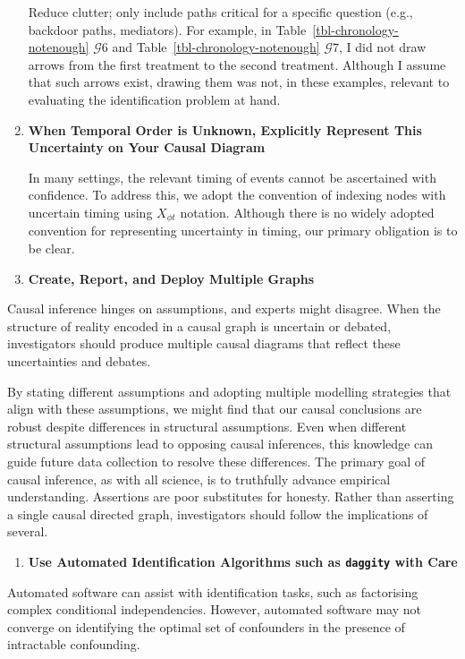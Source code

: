 \documentclass[
  single column]{article}
\providecommand{\tightlist}{%
  \setlength{\itemsep}{0pt}\setlength{\parskip}{0pt}}\usepackage{longtable,booktabs,array}
\begin{document}
\begin{enumerate}
  Reduce clutter; only include paths critical for a specific question
  (e.g., backdoor paths, mediators). For example, in
  Table~\ref{tbl-chronology-notenough} \(\mathcal{G} 6\) and
  Table~\ref{tbl-chronology-notenough} \(\mathcal{G} 7\), I did not draw
  arrows from the first treatment to the second treatment. Although I
  assume that such arrows exist, drawing them was not, in these
  examples, relevant to evaluating the identification problem at hand.
\item
  \textbf{When Temporal Order is Unknown, Explicitly Represent This
  Uncertainty on Your Causal Diagram}

  In many settings, the relevant timing of events cannot be ascertained
  with confidence. To address this, we adopt the convention of indexing
  nodes with uncertain timing using \(X_{\phi t}\) notation. Although
  there is no widely adopted convention for representing uncertainty in
  timing, our primary obligation is to be clear.
\item
  \textbf{Create, Report, and Deploy Multiple Graphs}
\end{enumerate}

Causal inference hinges on assumptions, and experts might disagree. When
the structure of reality encoded in a causal graph is uncertain or
debated, investigators should produce multiple causal diagrams that
reflect these uncertainties and debates.

By stating different assumptions and adopting multiple modelling
strategies that align with these assumptions, we might find that our
causal conclusions are robust despite differences in structural
assumptions. Even when different structural assumptions lead to opposing
causal inferences, this knowledge can guide future data collection to
resolve these differences. The primary goal of causal inference, as with
all science, is to truthfully advance empirical understanding.
Assertions are poor substitutes for honesty. Rather than asserting a
single causal directed graph, investigators should follow the
implications of several.

\begin{enumerate}
\def\labelenumi{\arabic{enumi}.}
\setcounter{enumi}{10}
\tightlist
\item
  \textbf{Use Automated Identification Algorithms such as
  \texttt{daggity} with Care}
\end{enumerate}

Automated software can assist with identification tasks, such as
factorising complex conditional independencies. However, automated
software may not converge on identifying the optimal set of confounders
in the presence of intractable confounding.
\end{document}

